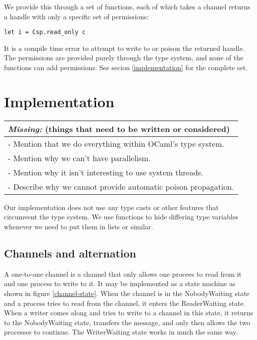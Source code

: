 \documentclass[a4paper,12pt]{article}
\newcommand{\missing}[1]{
  \begin{tabular}{|p{11cm}|}
    \hline
    \emph{Missing:} {\scriptsize (things that need to be written or considered)} \\
    \hline
    #1
    \hline
  \end{tabular}
}
\begin{document}
We provide this through a set of functions, each of which takes a channel
returns a handle with only a specific set of permissions:

\begin{verbatim}
let i = Csp.read_only c
\end{verbatim}

It is a compile time error to attempt to write to or poison the returned handle.
The permissions are provided purely through the type system, and none of the
functions can add permissions. See secion \ref{implementation} for the complete
set.

\section{Implementation}
\missing{
- Mention that we do everything within OCaml's type system.\\
- Mention why we can't have parallelism.\\
- Mention why it isn't interesting to use system threads.\\
- Describe why we cannot provide automatic poison propagation.\\
}
\label{implementation}

Our implementation does not use any type casts or other features that
circumvent the type system. We use functions to hide differing type variables
whenever we need to put them in lists or similar.

\subsection{Channels and alternation}
A one-to-one channel is a channel that only allows one procees to read from it
and one process 
to write to it. It may be implemented as a state machine as shown in figure \ref{channel-state}.
When the channel is in the NobodyWaiting state and a process tries to read from the channel,
it enters the ReaderWaiting state. When a writer comes along and tries to write to a channel
in this state, it returns to the NobodyWaiting state, transfers the message, and only then
allows the two processes to continue. The WriterWaiting state works in much the same way.
\end{document}
